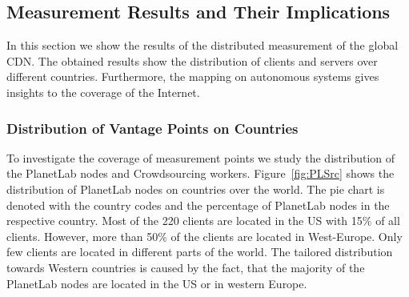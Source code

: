 \subsection{Measurement Results and Their Implications}
\label{sec:results}

In this section we show the results of the distributed measurement of the global CDN.
The obtained results show the distribution of clients and servers over different countries.
Furthermore, the mapping on autonomous systems gives insights to the coverage of the Internet.

\subsubsection{Distribution of Vantage Points on Countries}

To investigate the coverage of measurement points we study the distribution of the PlanetLab nodes and Crowdsourcing workers.
Figure~\ref{fig:PLSrc} shows the distribution of PlanetLab nodes on countries over the world.
The pie chart is denoted with the country codes and the percentage of PlanetLab nodes in the respective country.
Most of the 220 clients are located in the US with 15\% of all clients.
However, more than 50\% of the clients are located in West-Europe.
Only few clients are located in different parts of the world.
The tailored distribution towards Western countries is caused by the fact, that the majority of the PlanetLab nodes are located in the US or in western Europe.

